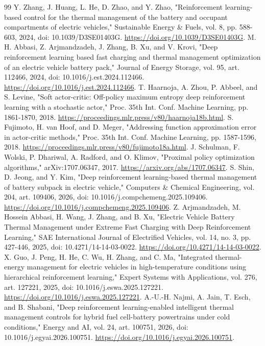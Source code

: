 \documentclass[conference]{IEEEtran}
\begin{document}
\begin{thebibliography}{99}
 Y. Zhang, J. Huang, L. He, D. Zhao, and Y. Zhao, "Reinforcement learning-based control for the thermal management of the battery and occupant compartments of electric vehicles," Sustainable Energy \& Fuels, vol. 8, pp. 588-603, 2024, doi: 10.1039/D3SE01403G. \url{https://doi.org/10.1039/D3SE01403G}.
 M. H. Abbasi, Z. Arjmandzadeh, J. Zhang, B. Xu, and V. Krovi, "Deep reinforcement learning based fast charging and thermal management optimization of an electric vehicle battery pack," Journal of Energy Storage, vol. 95, art. 112466, 2024, doi: 10.1016/j.est.2024.112466. \url{https://doi.org/10.1016/j.est.2024.112466}.
 T. Haarnoja, A. Zhou, P. Abbeel, and S. Levine, "Soft actor-critic: Off-policy maximum entropy deep reinforcement learning with a stochastic actor," Proc. 35th Int. Conf. Machine Learning, pp. 1861-1870, 2018. \url{https://proceedings.mlr.press/v80/haarnoja18b.html}.
 S. Fujimoto, H. van Hoof, and D. Meger, "Addressing function approximation error in actor-critic methods," Proc. 35th Int. Conf. Machine Learning, pp. 1587-1596, 2018. \url{https://proceedings.mlr.press/v80/fujimoto18a.html}.
 J. Schulman, F. Wolski, P. Dhariwal, A. Radford, and O. Klimov, "Proximal policy optimization algorithms," arXiv:1707.06347, 2017. \url{https://arxiv.org/abs/1707.06347}.
 S. Shin, D. Jeong, and Y. Kim, "Deep reinforcement learning-based thermal management of battery subpack in electric vehicle," Computers \& Chemical Engineering, vol. 204, art. 109406, 2026, doi: 10.1016/j.compchemeng.2025.109406. \url{https://doi.org/10.1016/j.compchemeng.2025.109406}.
 Z. Arjmandzadeh, M. Hossein Abbasi, H. Wang, J. Zhang, and B. Xu, "Electric Vehicle Battery Thermal Management under Extreme Fast Charging with Deep Reinforcement Learning," SAE International Journal of Electrified Vehicles, vol. 14, no. 3, pp. 427-446, 2025, doi: 10.4271/14-14-03-0022. \url{https://doi.org/10.4271/14-14-03-0022}.
 X. Guo, J. Peng, H. He, C. Wu, H. Zhang, and C. Ma, "Integrated thermal-energy management for electric vehicles in high-temperature conditions using hierarchical reinforcement learning," Expert Systems with Applications, vol. 276, art. 127221, 2025, doi: 10.1016/j.eswa.2025.127221. \url{https://doi.org/10.1016/j.eswa.2025.127221}.
 A.-U.-H. Najmi, A. Jain, T. Esch, and B. Shabani, "Deep reinforcement learning-enabled intelligent thermal management controls for hybrid fuel cell-battery powertrains under cold conditions," Energy and AI, vol. 24, art. 100751, 2026, doi: 10.1016/j.egyai.2026.100751. \url{https://doi.org/10.1016/j.egyai.2026.100751}.

\end{thebibliography}
\end{document}
